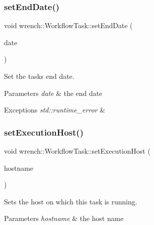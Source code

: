 \subsubsection{\texorpdfstring{set\+End\+Date()}{setEndDate()}}
{\footnotesize\ttfamily void wrench\+::\+Workflow\+Task\+::set\+End\+Date (\begin{DoxyParamCaption}\item[{double}]{date }\end{DoxyParamCaption})}



Set the task\textquotesingle{}s end date. 


\begin{DoxyParams}{Parameters}
{\em date} & the end date \\
\hline
\end{DoxyParams}

\begin{DoxyExceptions}{Exceptions}
{\em std\+::runtime\+\_\+error} & \\
\hline
\end{DoxyExceptions}
\mbox{\label{classwrench_1_1_workflow_task_aaabcde52939be67fbc645f937a7a1bc2}} 
\subsubsection{\texorpdfstring{set\+Execution\+Host()}{setExecutionHost()}}
{\footnotesize\ttfamily void wrench\+::\+Workflow\+Task\+::set\+Execution\+Host (\begin{DoxyParamCaption}\item[{std\+::string}]{hostname }\end{DoxyParamCaption})}



Sets the host on which this task is running. 


\begin{DoxyParams}{Parameters}
{\em hostname} & the host name \\
\hline
\end{DoxyParams}
\mbox{\label{classwrench_1_1_workflow_task_a03f9ebebaa0ec710e6b094f04eb221f5}} 
